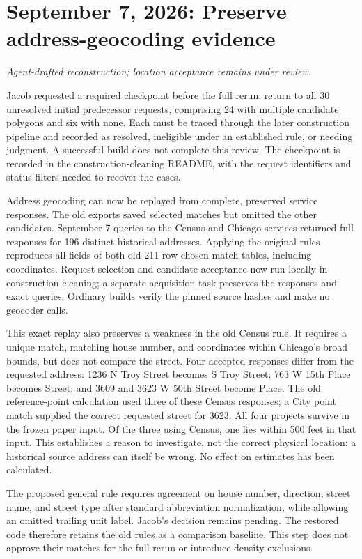 \section*{September 7, 2026: Preserve address-geocoding evidence}
\textit{Agent-drafted reconstruction; location acceptance remains under review.}

Jacob requested a required checkpoint before the full rerun: return to all 30
unresolved initial predecessor requests, comprising 24 with multiple candidate
polygons and six with none. Each must be traced through the later construction
pipeline and recorded as resolved, ineligible under an established rule, or needing
judgment. A successful build does not complete this review. The checkpoint is
recorded in the construction-cleaning README, with the request identifiers and
status filters needed to recover the cases.

Address geocoding can now be replayed from complete, preserved service responses.
The old exports saved selected matches but omitted the other candidates. September 7
queries to the Census and Chicago services returned full responses for 196 distinct
historical addresses. Applying the original rules reproduces all fields of both
old 211-row chosen-match tables, including coordinates. Request selection and
candidate acceptance now run locally in construction cleaning; a separate
acquisition task preserves the responses and exact queries. Ordinary builds verify
the pinned source hashes and make no geocoder calls.

This exact replay also preserves a weakness in the old Census rule. It requires a
unique match, matching house number, and coordinates within Chicago's broad bounds,
but does not compare the street. Four accepted responses differ from the requested
address: 1236 N Troy Street becomes S Troy Street; 763 W 15th Place becomes Street;
and 3609 and 3623 W 50th Street become Place. The old reference-point calculation
used three of these Census responses; a City point match supplied the correct
requested street for 3623. All four projects survive in the frozen paper input.
Of the three using Census, one lies within 500 feet in that input. This establishes
a reason to investigate, not the correct physical location: a historical source
address can itself be wrong. No effect on estimates has been calculated.

The proposed general rule requires agreement on house number, direction, street
name, and street type after standard abbreviation normalization, while allowing an
omitted trailing unit label. Jacob's decision remains pending. The restored code
therefore retains the old rules as a comparison baseline. This step does not
approve their matches for the full rerun or introduce density exclusions.

